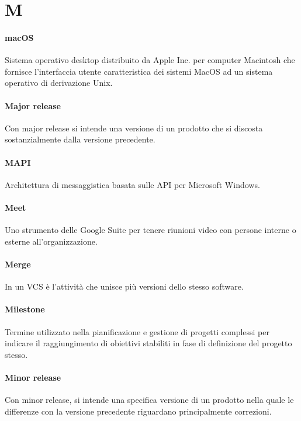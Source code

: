 \documentclass[]{article}
\begin{document}
	\newpage
	
	\section*{M}
	
	\paragraph*{macOS}
	Sistema operativo desktop distribuito da Apple Inc. per	computer Macintosh che fornisce l'interfaccia utente caratteristica dei sistemi	MacOS ad un sistema operativo di derivazione Unix.
	
	\paragraph*{Major release}
	Con major release si intende una versione di un prodotto che si discosta sostanzialmente dalla versione precedente.
	
	\paragraph*{MAPI}
	Architettura di messaggistica basata sulle API per Microsoft Windows.
	
	\paragraph*{Meet}
	Uno strumento delle Google Suite per tenere riunioni video con persone interne o esterne all'organizzazione.
	
	\paragraph*{Merge}
	In un VCS è l'attività che unisce più versioni dello stesso software.
	
	\paragraph*{Milestone}
	Termine utilizzato nella pianificazione e gestione di progetti complessi per indicare il raggiungimento di obiettivi stabiliti in fase di definizione del progetto stesso.
	
	\paragraph*{Minor release}
	Con minor release, si intende una specifica versione di un prodotto nella quale le differenze con la versione precedente riguardano principalmente correzioni.
	
\end{document}
